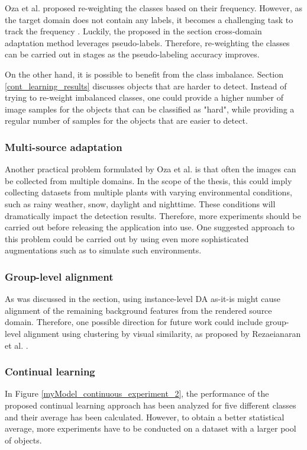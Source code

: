 Oza et al. proposed re-weighting the classes based on their frequency. However, as the target domain does not contain any labels, it becomes a challenging task to track the frequency \cite{Oza2021}. Luckily, the proposed in the  section cross-domain adaptation method leverages pseudo-labels. Therefore, re-weighting the classes can be carried out in stages as the pseudo-labeling accuracy improves. 

On the other hand, it is possible to benefit from the class imbalance. Section \ref{cont_learning_results} discusses objects that are harder to detect. Instead of trying to re-weight imbalanced classes, one could provide a higher number of image samples for the objects that can be classified as "hard", while providing a regular number of samples for the objects that are easier to detect.

\subsubsection{Multi-source adaptation}
Another practical problem formulated by Oza et al. \cite{Oza2021} is that often the images can be collected from multiple domains. In the scope of the thesis, this could imply collecting datasets from multiple plants with varying environmental conditions, such as rainy weather, snow, daylight and nighttime. These conditions will dramatically impact the detection results. Therefore, more experiments should be carried out before releasing the application into use. One suggested approach to this problem could be carried out by using even more sophisticated augmentations such as \cite{imgaug} to simulate such environments. 

\subsubsection{Group-level alignment}
As was discussed in the  section, using instance-level DA as-it-is might cause alignment of the remaining background features from the rendered source domain. Therefore, one possible direction for future work could include group-level alignment using clustering by visual similarity, as proposed by Rezaeianaran et al. \cite{Rezaeianaran2021}. 

\subsubsection{Continual learning}
In Figure \ref{myModel_continuous_experiment_2}, the performance of the proposed continual learning approach has been analyzed for five different classes and their average has been calculated. However, to obtain a better statistical average, more experiments have to be conducted on a dataset with a larger pool of objects. 

